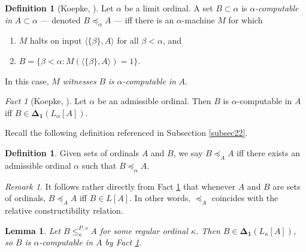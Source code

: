 \documentclass[12pt, twoside]{memoir}
\numberwithin{equation}{section}
\newtheorem{lem}[thm]{Lemma}
\theoremstyle{definition}
\newtheorem{defi}[thm]{Definition}
\theoremstyle{remark}
\newtheorem{rem}[thm]{Remark}
\newtheorem{fact}[thm]{Fact}
\theoremstyle{definition}
\theoremstyle{definition}
\theoremstyle{definition}
\theoremstyle{remark}
\begin{document}
\begin{defi}[Koepke, \cite{koepke2}]
Let $\alpha$ be a limit ordinal. A set $B \subset \alpha$ is $\alpha$\emph{-computable in} $A \subset \alpha$ --- denoted $B \preceq_{\alpha} A$ --- iff there is an $\alpha$-machine $M$ for which
\begin{enumerate}[label=(\alph*)]
    \item $M$ halts on input $\langle \{\beta\}, A \rangle$ for all $\beta < \alpha$, and
    \item $B = \{\beta < \alpha : M(\langle \{\beta\}, A \rangle) = 1\}$.
\end{enumerate}
In this case, $M$ \emph{witnesses} $B$ \emph{is} $\alpha$\emph{-computable in} $A$.
\end{defi}

\begin{fact}[Koepke, \cite{koepke2}]\label{fact334}
Let $\alpha$ be an admissible ordinal. Then $B$ is $\alpha$-computable in $A$ iff $B \in \mathbf{\Delta_1}(L_{\alpha}[A])$.
\end{fact}

Recall the following definition referenced in Subsection \ref{subsec22}.

\begin{defi}
Given sets of ordinals $A$ and $B$, we say $B \preceq_A A$ iff there exists an admissible ordinal $\alpha$ such that $B \preceq_{\alpha} A$.
\end{defi}

\begin{rem}\label{rem336}
It follows rather directly from Fact \ref{fact334} that whenever $A$ and $B$ are sets of ordinals, $B \preceq_A A$ iff $B \in L[A]$. In other words, $\preceq_A$ coincides with the relative constructibility relation.
\end{rem}

\begin{lem}\label{lem269}
Let $B \leq^{P, s}_{\kappa} A$ for some regular ordinal $\kappa$. Then $B \in \mathbf{\Delta_1}(L_{\kappa}[A])$, so $B$ is $\alpha$-computable in $A$ by Fact \ref{fact334}.
\end{lem}
\end{document}
